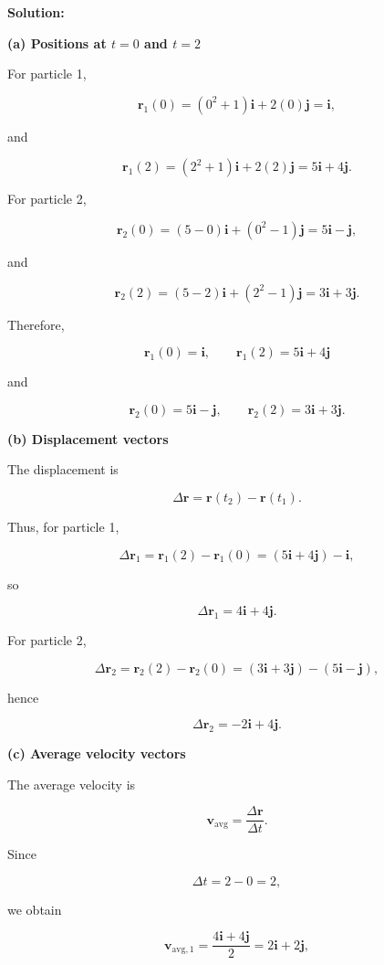 \documentclass[12pt]{article}
\theoremstyle{remark}
\begin{document}
\textbf{Solution:}

\textbf{(a) Positions at \(t=0\) and \(t=2\)}

For particle 1,

\[
\mathbf{r}_1(0)
=
(0^2+1)\mathbf{i}+2(0)\mathbf{j}
=
\mathbf{i},
\]

and

\[
\mathbf{r}_1(2)
=
(2^2+1)\mathbf{i}+2(2)\mathbf{j}
=
5\mathbf{i}+4\mathbf{j}.
\]

For particle 2,

\[
\mathbf{r}_2(0)
=
(5-0)\mathbf{i}+(0^2-1)\mathbf{j}
=
5\mathbf{i}-\mathbf{j},
\]

and

\[
\mathbf{r}_2(2)
=
(5-2)\mathbf{i}+(2^2-1)\mathbf{j}
=
3\mathbf{i}+3\mathbf{j}.
\]

Therefore,

\[
\boxed{
\mathbf{r}_1(0)=\mathbf{i},
\qquad
\mathbf{r}_1(2)=5\mathbf{i}+4\mathbf{j}
}
\]

and

\[
\boxed{
\mathbf{r}_2(0)=5\mathbf{i}-\mathbf{j},
\qquad
\mathbf{r}_2(2)=3\mathbf{i}+3\mathbf{j}.
}
\]

\textbf{(b) Displacement vectors}

The displacement is

\[
\Delta \mathbf{r}
=
\mathbf{r}(t_2)-\mathbf{r}(t_1).
\]

Thus, for particle 1,

\[
\Delta \mathbf{r}_1
=
\mathbf{r}_1(2)-\mathbf{r}_1(0)
=
(5\mathbf{i}+4\mathbf{j})-\mathbf{i},
\]

so

\[
\boxed{
\Delta \mathbf{r}_1
=
4\mathbf{i}+4\mathbf{j}.
}
\]

For particle 2,

\[
\Delta \mathbf{r}_2
=
\mathbf{r}_2(2)-\mathbf{r}_2(0)
=
(3\mathbf{i}+3\mathbf{j})-(5\mathbf{i}-\mathbf{j}),
\]

hence

\[
\boxed{
\Delta \mathbf{r}_2
=
-2\mathbf{i}+4\mathbf{j}.
}
\]

\textbf{(c) Average velocity vectors}

The average velocity is

\[
\mathbf{v}_{\mathrm{avg}}
=
\frac{\Delta\mathbf{r}}{\Delta t}.
\]

Since

\[
\Delta t=2-0=2,
\]

we obtain

\[
\mathbf{v}_{\mathrm{avg},1}
=
\frac{4\mathbf{i}+4\mathbf{j}}{2}
=
2\mathbf{i}+2\mathbf{j},
\]
\end{document}
